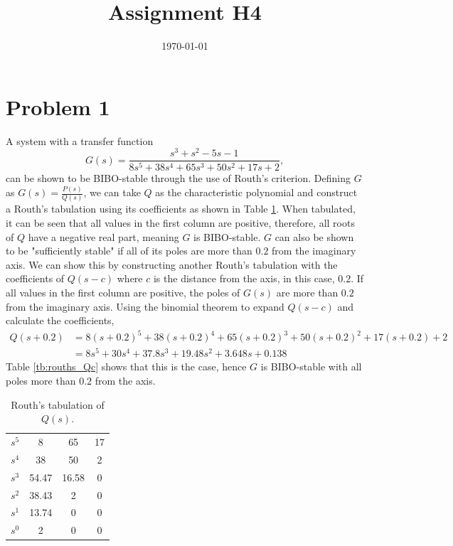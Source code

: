 \documentclass[10pt,a4paper]{article}
\date{\today}
\title{Assignment H4}
\begin{document}
    \header{}
    \section{Problem 1} 
        A system with a transfer function
        \begin{equation}
            G(s) = \frac{s^3 + s^2 - 5s -1}{8s^5 + 38s^4 + 65s^3 + 50s^2 + 17s + 2},
        \end{equation}
        can be shown to be BIBO-stable through the use of Routh's criterion. Defining $G$ as $G(s) = \frac{P(s)}{Q(s)}$, we can take $Q$ as the characteristic polynomial and construct a Routh's tabulation using its coefficients as shown in Table \ref{tb:rouths_Q}. When tabulated, it can be seen that all values in the first column are positive, therefore, all roots of $Q$ have a negative real part, meaning $G$ is BIBO-stable. $G$ can also be shown to be "sufficiently stable" if all of its poles are more than $0.2$ from the imaginary axis. We can show this by constructing another Routh's tabulation with the coefficients of $Q(s - c)$ where $c$ is the distance from the axis, in this case, $0.2$. If all values in the first column are positive, the poles of $G(s)$ are more than $0.2$ from the imaginary axis. Using the binomial theorem to expand $Q(s-c)$ and calculate the coefficients, 
        \begin{align}
            Q(s + 0.2) &= 8(s + 0.2)^5 + 38(s + 0.2)^4 + 65(s + 0.2)^3 + 50(s + 0.2)^2 + 17(s + 0.2) + 2 \\
            &= 8s^5 + 30s^4 + 37.8s^3 + 19.48s^2 + 3.648s + 0.138
        \end{align}
        Table \ref{tb:rouths_Qc} shows that this is the case, hence $G$ is BIBO-stable with all poles more than $0.2$ from the axis.
        \begin{table}[h]
            \centering
            \begin{tabular}{ c | c c c}
                $s^5$ & 8     & 65    & 17 \\
                $s^4$ & 38    & 50    & 2  \\
                $s^3$ & 54.47 & 16.58 & 0  \\
                $s^2$ & 38.43 & 2     & 0  \\
                $s^1$ & 13.74 & 0     & 0  \\
                $s^0$ & 2     & 0     & 0             
            \end{tabular}
            \caption{Routh's tabulation of $Q(s)$.}
            \label{tb:rouths_Q}
        \end{table}
\end{document}
